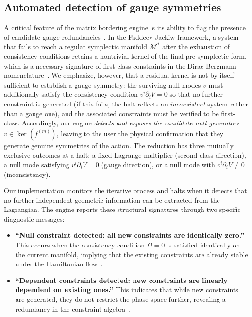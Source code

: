 \documentclass[11pt,a4paper]{article}
\begin{document}
\subsection{Automated detection of gauge symmetries}


A critical feature of the matrix bordering engine is its ability to flag the presence of candidate gauge redundancies~\cite{Henneaux1992,Rothe1997}. In the Faddeev-Jackiw framework, a system that fails to reach a regular symplectic manifold $\mathcal{M}^*$ after the exhaustion of consistency conditions retains a nontrivial kernel of the final pre-symplectic form, which is a necessary signature of first-class constraints in the Dirac-Bergmann nomenclature~\cite{Dirac1964,GitmanTyutin1990}. We emphasize, however, that a residual kernel is not by itself sufficient to establish a gauge symmetry: the surviving null modes $v$ must additionally satisfy the consistency condition $v^i\partial_i V = 0$ so that no further constraint is generated (if this fails, the halt reflects an \emph{inconsistent} system rather than a gauge one), and the associated constraints must be verified to be first-class. Accordingly, our engine \emph{detects and exposes the candidate null generators} $v\in\ker(f^{(m)})$, leaving to the user the physical confirmation that they generate genuine symmetries of the action. The reduction has three mutually exclusive outcomes at a halt: a fixed Lagrange multiplier (second-class direction), a null mode satisfying $v^i\partial_i V=0$ (gauge direction), or a null mode with $v^i\partial_i V\neq 0$ (inconsistency).


Our implementation monitors the iterative process and halts when it detects that no further independent geometric information can be extracted from the Lagrangian. The engine reports these structural signatures through two specific diagnostic messages:

\begin{itemize}
	\item \textbf{``Null constraint detected: all new constraints are identically zero.''} This occurs when the consistency condition $\dot{\Omega} = 0$ is satisfied identically on the current manifold, implying that the existing constraints are already stable under the Hamiltonian flow~\cite{ArnoldBook,Marsden1999}.
	\item \textbf{``Dependent constraints detected: new constraints are linearly dependent on existing ones.''} This indicates that while new constraints are generated, they do not restrict the phase space further, revealing a redundancy in the constraint algebra~\cite{Henneaux1992,GitmanTyutin1990}.
\end{itemize}
\end{document}
